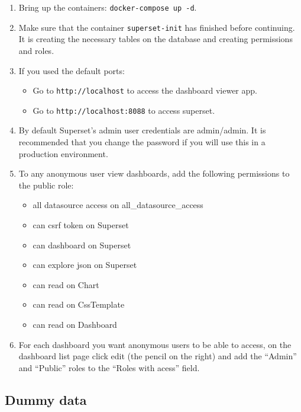 \documentclass[
]{book}
\providecommand{\tightlist}{%
  \setlength{\itemsep}{0pt}\setlength{\parskip}{0pt}}
\begin{document}
\begin{enumerate}
\def\labelenumi{\arabic{enumi}.}
\item
  Bring up the containers: \texttt{docker-compose\ up\ -d}.
\item
  Make sure that the container \texttt{superset-init} has finished before continuing. It is creating the necessary tables on the database and creating permissions and roles.
\item
  If you used the default ports:

  \begin{itemize}
  \tightlist
  \item
    Go to \texttt{http://localhost} to access the dashboard viewer app.
  \item
    Go to \texttt{http://localhost:8088} to access superset.
  \end{itemize}
\item
  By default Superset's admin user credentials are admin/admin.
  It is recommended that you change the password if you will use this in a production environment.
\item
  To any anonymous user view dashboards, add the following permissions to the public role:

  \begin{itemize}
  \tightlist
  \item
    all datasource access on all\_datasource\_access
  \item
    can csrf token on Superset
  \item
    can dashboard on Superset
  \item
    can explore json on Superset
  \item
    can read on Chart
  \item
    can read on CssTemplate
  \item
    can read on Dashboard
  \end{itemize}
\item
  For each dashboard you want anonymous users to be able to access, on the dashboard list page click edit (the pencil on the right) and add the ``Admin'' and ``Public'' roles to the ``Roles with acess'' field.
\end{enumerate}

\hypertarget{dummy-data}{%
\subsection*{Dummy data}\label{dummy-data}}
\end{document}
